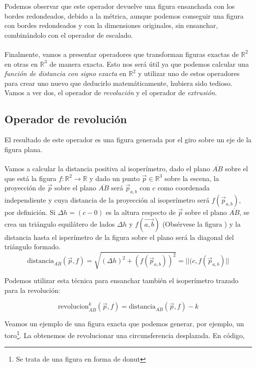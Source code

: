 Podemos observar que este operador devuelve una figura ensanchada con los bordes redondeados, debido a la métrica, aunque podemos conseguir una figura con bordes redondeados y con la dimensiones originales, sin ensanchar, combinándolo con el operador de escalado.\\\\
Finalmente, vamos a presentar operadores que transforman figuras exactas de \(\mathbb{R}^2\) en otras en \(\mathbb{R}^3\) de manera exacta. Esto nos será útil ya que podemos calcular una \textit{función de distancia con signo exacta} en \(\mathbb{R}^2\) y utilizar uno de estos operadores para crear uno nuevo que deducirlo matemáticamente, hubiera sido tedioso. Vamos a ver dos, el operador de \textit{revolución} y el operador de \textit{extrusión}.
\newpage
\subsection{Operador de revolución}
El resultado de este operador es una figura generada por el giro sobre un eje de la figura plana.\\\\
Vamos a calcular la distancia positiva al isoperímetro, dado el plano \(\overline{AB}\) sobre el que está la figura \(f:\mathbb{R}^2\longrightarrow\mathbb{R}\) y dado un punto \(\Vec{p}\in\mathbb{R}^3\) sobre la escena, la proyección de \(\Vec{p}\) sobre el plano \(\overline{AB}\) será \(\Vec{p}_{a,b}\) con \(c\) como coordenada independiente y cuya distancia de la proyección al isoperímetro será \(f(\Vec{p}_{a,b})\), por definición. Si \(\Delta h=(c-0)\) es la altura respecto de \(\Vec{p}\) sobre el plano \(\overline{AB}\), se crea un triángulo equilátero de lados \(\Delta h\) y \( f(\Vec{a,b})\) (Obsérvese la figura ) y la distancia  hasta el isperímetro de la figura sobre el plano será la diagonal del triángulo formado.
\[\text{distancia}_{\overline{AB}}(\Vec{p}, f)= \sqrt{(\Delta h)^2+(f(\Vec{p}_{a,b}))^2}=\vert\vert(c, f(\Vec{p}_{a,b})\vert\vert\]

Podemos utilizar esta técnica para ensanchar también el isoperímetro trazado para la revolución:

\[\text{revolucion}_{\overline{AB}}^k(\Vec{p}, f)=\text{distancia}_{\overline{AB}}(\Vec{p}, f)-k\]

Veamos un ejemplo de una figura exacta que podemos generar, por ejemplo, un toro\footnote{Se trata de una figura en forma de donut}. La obtenemos de revolucionar una circunsferencia desplazada. En código,

